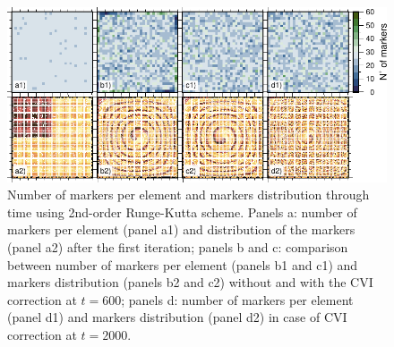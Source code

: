 \begin{figure}[h!]
\centering
\includegraphics[width=15cm]{./Figures/CVI_time.pdf}
\caption{Number of markers per element and markers distribution through time using 2nd-order Runge-Kutta scheme.
Panels a: number of markers per element (panel a1) and distribution of the markers (panel a2) after the first
iteration; panels b and c: comparison between number of markers per element (panels b1 and c1) and markers distribution (panels b2 and c2) without and with
the CVI correction at $t=600$; panels d: number of markers per element (panel d1) and markers distribution (panel d2) in case of CVI correction at $t=2000$.}
\label{fig:CVI_time}
\end{figure}